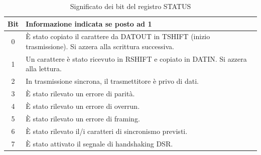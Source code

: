 \begin{table}[h]
    \centering
    \begin{tabular}{|c|p{11cm}|}
    \hline
    \textbf{Bit} & \textbf{Informazione indicata se posto ad 1} \\
    \hline
    0 & È stato copiato il carattere da DATOUT in TSHIFT (inizio trasmissione). Si azzera alla scrittura successiva. \\
    1 & Un carattere è stato ricevuto in RSHIFT e copiato in DATIN. Si azzera alla lettura. \\
    2 & In trasmissione sincrona, il trasmettitore è privo di dati. \\
    3 & È stato rilevato un errore di parità. \\
    4 & È stato rilevato un errore di overrun. \\
    5 & È stato rilevato un errore di framing. \\
    6 & È stato rilevato il/i caratteri di sincronismo previsti. \\
    7 & È stato attivato il segnale di handshaking DSR. \\
    \hline
    \end{tabular}
    \caption{Significato dei bit del registro STATUS}\label{tab:STAT-8251}
\end{table}
    
  